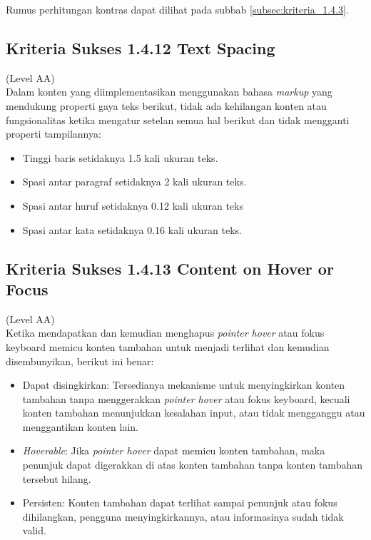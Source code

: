 Rumus perhitungan kontras dapat dilihat pada subbab \ref{subsec:kriteria_1.4.3}.

\subsection{Kriteria Sukses 1.4.12 Text Spacing}
\label{subsec:kriteria_1.4.12}
(Level AA) \\

Dalam konten yang diimplementasikan menggunakan bahasa \textit{markup} yang mendukung properti gaya teks berikut, tidak ada kehilangan konten atau fungsionalitas ketika mengatur setelan semua hal berikut dan tidak mengganti properti tampilannya: 

\begin{itemize}
	\item Tinggi baris setidaknya 1.5 kali ukuran teks.
	\item Spasi antar paragraf setidaknya 2 kali ukuran teks.
	\item Spasi antar huruf setidaknya 0.12 kali ukuran teks
	\item Spasi antar kata setidaknya 0.16 kali ukuran teks.
\end{itemize}

\subsection{Kriteria Sukses 1.4.13 Content on Hover or Focus}
\label{subsec:kriteria_1.4.13}
(Level AA) \\

Ketika mendapatkan dan kemudian menghapus \textit{pointer hover} atau fokus keyboard memicu konten tambahan untuk menjadi terlihat dan kemudian disembunyikan, berikut ini benar:

\begin{itemize}
	\item Dapat disingkirkan: Tersedianya mekanisme untuk menyingkirkan konten tambahan tanpa menggerakkan \textit{pointer hover} atau fokus keyboard, kecuali konten tambahan menunjukkan kesalahan input, atau tidak mengganggu atau menggantikan konten lain.
	\item \textit{Hoverable}: Jika \textit{pointer hover} dapat memicu konten tambahan, maka penunjuk dapat digerakkan di atas konten tambahan tanpa konten tambahan tersebut hilang.
	\item Persisten: Konten tambahan dapat terlihat sampai penunjuk atau fokus dihilangkan, pengguna menyingkirkannya, atau informasinya sudah tidak valid.
\end{itemize}


